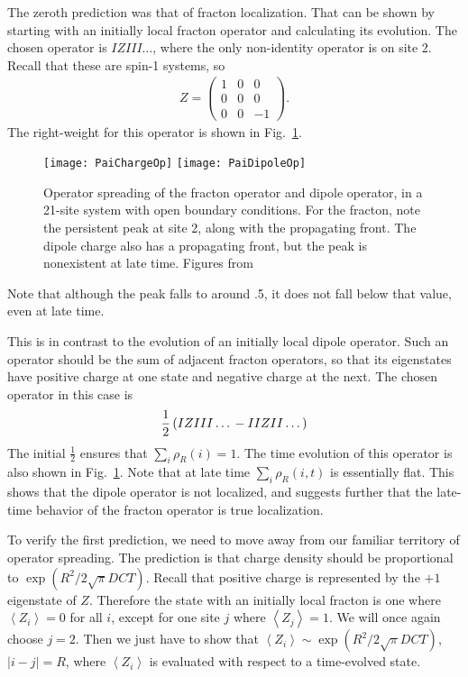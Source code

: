 \documentclass[a4paper,12pt]{article}
\renewcommand{\th}[1]{\frac{1}{#1}}
\newcommand{\ex}[1]{\left\langle #1 \right\rangle}
\newcommand{\note}[1]{{\color{red}{#1}}}
\begin{document}
The zeroth prediction was that of fracton localization. That can be shown by starting with an initially local fracton operator and calculating its evolution. The chosen operator is $IZIII\dots$, where the only non-identity operator is on site 2. Recall that these are spin-1 systems, so 
\begin{align}
Z = \begin{pmatrix} 1 & 0 & 0 \\ 0 & 0 & 0 \\ 0 & 0 & -1 \end{pmatrix}.
\end{align}
The right-weight for this operator is shown in Fig.~\ref{fig:PaiChargeOp}.
\begin{figure}
	\centering
	\texttt{[image: PaiChargeOp]}
	\texttt{[image: PaiDipoleOp]}
	\caption{Operator spreading of the fracton operator and dipole operator, in a 21-site system with open boundary conditions. For the fracton, note the persistent peak at site 2, along with the propagating front. The dipole charge also has a propagating front, but the peak is nonexistent at late time. Figures from~\cite{PaiFracton}}
	\label{fig:PaiChargeOp}
\end{figure}
Note that although the peak falls to around .5, it does not fall below that value, even at late time. \note{Is this value significant?}

This is in contrast to the evolution of an initially local dipole operator. Such an operator should be the sum of adjacent fracton operators, so that its eigenstates have positive charge at one state and negative charge at the next. The chosen operator in this case is 
\begin{align}
\th{2}\left(IZIII\dots \vphantom{j}-IIZII\dots\right)
\end{align}
\note{Shouldn't it be $\th{\sqrt{2}}$?} The initial $\th{2}$ ensures that $\sum_i\rho_R(i)=1$. The time evolution of this operator is also shown in Fig.~\ref{fig:PaiChargeOp}. Note that at late time $\sum_i\rho_R(i, t)$ is essentially flat. This shows that the dipole operator is not localized, and suggests further that the late-time behavior of the fracton operator is true localization. 

To verify the first prediction, we need to move away from our familiar territory of operator spreading. The prediction is that charge density should be proportional to $\exp(R^2/2\sqrt{\pi}DCT)$. Recall that positive charge is represented by the $+1$ eigenstate of $Z$. Therefore the state with an initially local fracton is one where $\ex{Z_i}=0$ for all $i$, except for one site $j$ where $\ex{Z_j}=1$. We will once again choose $j=2$. Then we just have to show that $\ex{Z_i}\sim\exp(R^2/2\sqrt{\pi}DCT)$, $|i-j|=R$, where $\ex{Z_i}$ is evaluated with respect to a time-evolved state.
\end{document}
